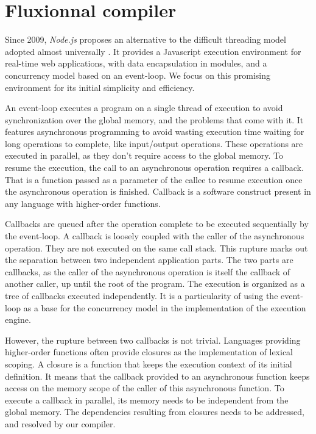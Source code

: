 \section{Fluxionnal compiler} \label{section:compiler}

Since 2009, \textit{Node.js} proposes an alternative to the difficult threading model adopted almost universally \cite{Adya2002}.
It provides a Javascript execution environment for real-time web applications, with data encapsulation in modules, and a concurrency model based on an event-loop.
We focus on this promising environment for its initial simplicity and efficiency.

An event-loop executes a program on a single thread of execution to avoid synchronization over the global memory, and the problems that come with it.
It features asynchronous programming to avoid wasting execution time waiting for long operations to complete, like input/output operations.
These operations are executed in parallel, as they don't require access to the global memory.
To resume the execution, the call to an asynchronous operation requires a callback.
That is a function passed as a parameter of the callee to resume execution once the asynchronous operation is finished.
Callback is a software construct present in any language with higher-order functions.

Callbacks are queued after the operation complete to be executed sequentially by the event-loop.
A callback is loosely coupled with the caller of the asynchronous operation.
They are not executed on the same call stack.
This rupture marks out the separation between two independent application parts.
The two parts are callbacks, as the caller of the asynchronous operation is itself the callback of another caller, up until the root of the program.
The execution is organized as a tree of callbacks executed independently.
It is a particularity of using the event-loop as a base for the concurrency model in the implementation of the execution engine.

However, the rupture between two callbacks is not trivial.
Languages providing higher-order functions often provide closures as the implementation of lexical scoping.
A closure is a function that keeps the execution context of its initial definition.
It means that the callback provided to an asynchronous function keeps access on the memory scope of the caller of this asynchronous function.
To execute a callback in parallel, its memory needs to be independent from the global memory.
The dependencies resulting from closures needs to be addressed, and resolved by our compiler.

